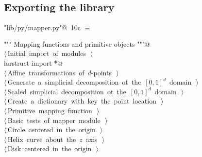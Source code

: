 \documentclass[11pt,oneside]{article}	%
\begin{document}
\subsection{Exporting the library}
\begin{flushleft} \small \label{scrap22}
\protect{}\verb@"lib/py/mapper.py"@\nobreak\ {\footnotesize 10c }$\equiv$
\vspace{-1ex}
\begin{list}{}{} \item
\mbox{}\verb@""" Mapping functions and primitive objects """@\\
\mbox{}\verb@@\hbox{$\langle\,$Initial import of modules\nobreak\ {\footnotesize {}}$\,\rangle$}\verb@@\\
\mbox{}\verb@from larstruct import *@\\
\mbox{}\verb@@\hbox{$\langle\,$Affine transformations of $d$-points\nobreak\ {\footnotesize {}}$\,\rangle$}\verb@@\\
\mbox{}\verb@@\hbox{$\langle\,$Generate a simplicial decomposition ot the $[0,1]^d$ domain\nobreak\ {\footnotesize {}}$\,\rangle$}\verb@@\\
\mbox{}\verb@@\hbox{$\langle\,$Scaled simplicial decomposition ot the $[0,1]^d$ domain\nobreak\ {\footnotesize {}}$\,\rangle$}\verb@@\\
\mbox{}\verb@@\hbox{$\langle\,$Create a dictionary with key the point location\nobreak\ {\footnotesize {}}$\,\rangle$}\verb@@\\
\mbox{}\verb@@\hbox{$\langle\,$Primitive mapping function\nobreak\ {\footnotesize {}}$\,\rangle$}\verb@@\\
\mbox{}\verb@@\hbox{$\langle\,$Basic tests of mapper module\nobreak\ {\footnotesize {}}$\,\rangle$}\verb@@\\
\mbox{}\verb@@\hbox{$\langle\,$Circle centered in the origin\nobreak\ {\footnotesize {}}$\,\rangle$}\verb@@\\
\mbox{}\verb@@\hbox{$\langle\,$Helix curve about the $z$ axis\nobreak\ {\footnotesize {}}$\,\rangle$}\verb@@\\
\mbox{}\verb@@\hbox{$\langle\,$Disk centered in the origin\nobreak\ {\footnotesize {}}$\,\rangle$}\verb@@\\

\end{list}
\end{flushleft}
\end{document}
